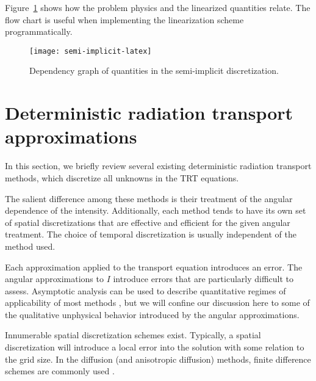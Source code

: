 Figure~\ref{fig:semiImplicitFlowchart} shows how the problem physics and the
linearized quantities relate. The flow chart is useful when
implementing the linearization scheme programmatically. 

\begin{figure}[htbp]
  \centering
  \texttt{[image: semi-implicit-latex]}
  \caption{Dependency graph of quantities in the semi-implicit discretization.}
  \label{fig:semiImplicitFlowchart}
\end{figure}

\section{Deterministic radiation transport approximations}
\label{sec:bgApproxMethods}

In this section, we briefly review several existing deterministic radiation
transport methods, which discretize all unknowns in the TRT equations.

The salient difference among these methods is their treatment of
the angular dependence of the intensity. Additionally, each method tends to have
its own set of spatial discretizations that are effective and efficient for the
given angular treatment. The choice of temporal discretization is usually
independent of the method used.

Each approximation applied to the transport
equation introduces an error. The angular approximations to $I$
introduce errors that are particularly difficult to assess. Asymptotic
analysis can be used to describe quantitative regimes of applicability of most
methods \cite{Lar1983a,Ada1998a,Mor2000}, but we will confine our discussion
here to some of the qualitative
unphysical behavior introduced by the angular approximations.

Innumerable spatial discretization schemes exist. Typically, a
spatial discretization will introduce a local error into the solution with some
relation to the grid size. In the diffusion (and anisotropic diffusion) methods,
finite difference schemes are commonly used \cite{Lev2007}.

